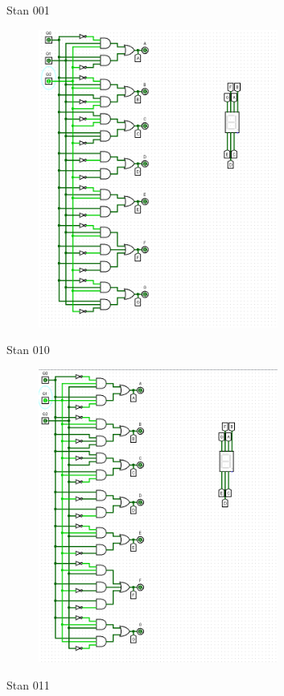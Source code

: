 \documentclass[]{article}
\begin{document}
\newpage
Stan 001
\begin{figure}[H]
	\centering
	\includegraphics[width=0.7\textwidth]{DWA_001.png}
\end{figure}
\newpage
Stan 010
\begin{figure}[H]
	\centering
	\includegraphics[width=0.7\textwidth]{DWA_010.png}
\end{figure}
\newpage
Stan 011
\end{document}
